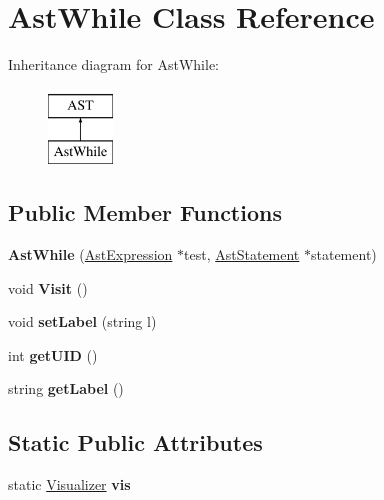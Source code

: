 \hypertarget{classAstWhile}{\section{Ast\-While Class Reference}
\label{classAstWhile}
}
Inheritance diagram for Ast\-While\-:\begin{figure}[H]
\begin{center}
\leavevmode
\includegraphics[height=2.000000cm]{classAstWhile}
\end{center}
\end{figure}
\subsection*{Public Member Functions}
\begin{DoxyCompactItemize}
\item 
\hypertarget{classAstWhile_a4c0e68b002b9425fba3f3e7b21a31e64}{{\bfseries Ast\-While} (\hyperlink{classAstExpression}{Ast\-Expression} $\ast$test, \hyperlink{classAstStatement}{Ast\-Statement} $\ast$statement)}\label{classAstWhile_a4c0e68b002b9425fba3f3e7b21a31e64}

\item 
\hypertarget{classAstWhile_a9bf8eb5f0f63a4f0dc7b7201f292d4dd}{void {\bfseries Visit} ()}\label{classAstWhile_a9bf8eb5f0f63a4f0dc7b7201f292d4dd}

\item 
\hypertarget{classAST_a71d680856e95ff89f55d5311a552eba6}{void {\bfseries set\-Label} (string l)}\label{classAST_a71d680856e95ff89f55d5311a552eba6}

\item 
\hypertarget{classAST_ab7a5b1d9f1c2de0d98deb356f724a42c}{int {\bfseries get\-U\-I\-D} ()}\label{classAST_ab7a5b1d9f1c2de0d98deb356f724a42c}

\item 
\hypertarget{classAST_aee029be902fffc927d16ccb03eb922ad}{string {\bfseries get\-Label} ()}\label{classAST_aee029be902fffc927d16ccb03eb922ad}

\end{DoxyCompactItemize}
\subsection*{Static Public Attributes}
\begin{DoxyCompactItemize}
\item 
\hypertarget{classAST_aca9e6637209b31e03a09c0d42f29bdfa}{static \hyperlink{classVisualizer}{Visualizer} {\bfseries vis}}\label{classAST_aca9e6637209b31e03a09c0d42f29bdfa}

\end{DoxyCompactItemize}
